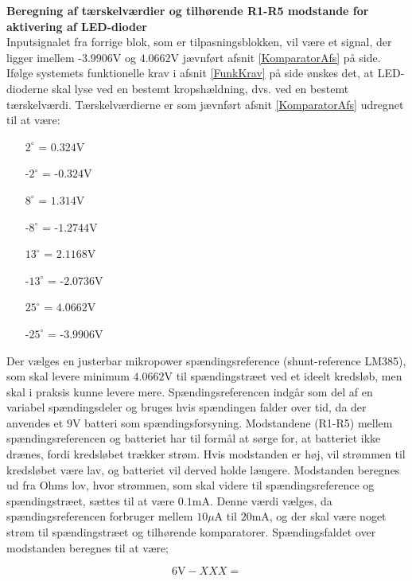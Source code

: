 \noindent\textbf{Beregning af tærskelværdier og tilhørende R1-R5 modstande for aktivering af LED-dioder} \\
Inputsignalet fra forrige blok, som er tilpasningsblokken, vil være et signal, der ligger imellem -$3.9906$V og $4.0662$V jævnført afsnit \ref{KomparatorAfs} på side\pageref{KomparatorAfs}. Ifølge systemets funktionelle krav i afsnit \ref{FunkKrav} på side \pageref{FunkKrav} ønskes det, at LED-dioderne skal lyse ved en bestemt kropshældning, dvs. ved en bestemt tærskelværdi. %
Tærskelværdierne er som jævnført afsnit \ref{KomparatorAfs} udregnet til at være:
\begin{itemize}
\item[$2^{\circ}$ = $0.324$V]
\item[-$2^{\circ}$ = -$0.324$V]
\item[$8^{\circ}$ = $1.314$V]
\item[-$8^{\circ}$ = -$1.2744$V]
\item[$13^{\circ}$ = $2.1168$V]
\item[-$13^{\circ}$ = -$2.0736$V]
\item[$25^{\circ}$ = $4.0662$V]
\item[-$25^{\circ}$ = -$3.9906$V]
\end{itemize}

Der vælges en justerbar mikropower spændingsreference (shunt-reference LM385), som skal levere minimum $4.0662$V til spændingstræet ved et ideelt kredsløb, men skal i praksis kunne levere mere. Spændingsreferencen indgår som del af en variabel spændingsdeler og bruges hvis spændingen falder over tid, da der anvendes et $9$V batteri som spændingsforsyning. Modstandene (R1-R5) mellem spændingsreferencen og batteriet har til formål at sørge for, at batteriet ikke drænes, fordi kredsløbet trækker strøm. Hvis modstanden er høj, vil strømmen til kredsløbet være lav, og batteriet vil derved holde længere. Modstanden beregnes ud fra Ohms lov, hvor strømmen, som skal videre til spændingsreference og spændingstræet, sættes til at være $0.1$mA. Denne værdi vælges, da spændingsreferencen forbruger mellem $10\mu$A til $20$mA, og der skal være noget strøm til spændingstræet og tilhørende komparatorer. Spændingsfaldet over modstanden beregnes til at være;

\begin{equation}
6\text{V} - XXX  =   
\end{equation}



